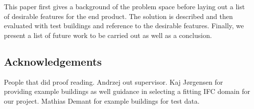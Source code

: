 This paper first gives a background of the problem space before laying out a list of desirable features for the end product. The solution is described and then evaluated with test buildings and reference to the desirable features. Finally, we present a list of future work to be carried out as well as a conclusion.
\subsection{Acknowledgements}
People that did proof reading. Andrzej out supervisor. Kaj Jørgensen for providing example buildings as well guidance in selecting a fitting IFC domain for our project. Mathias Demant for example buildings for test data.

